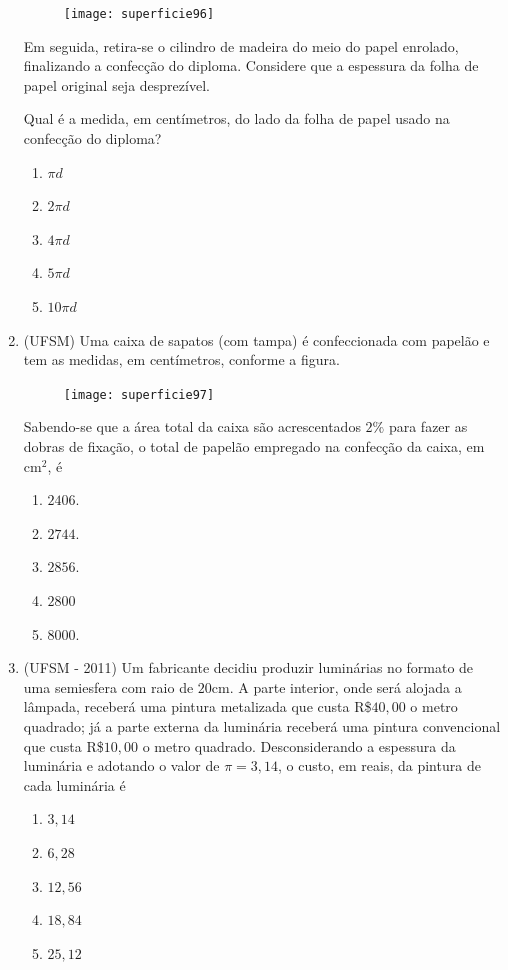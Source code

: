 \begin{enumerate}
\begin{figure}[H]
  \texttt{[image: superficie96]}
  \end{figure}

  Em seguida, retira-se o cilindro de madeira do meio do  papel enrolado, finalizando a confecção do diploma. Considere que a espessura da folha de papel original seja desprezível.
\clearpage

  Qual é a medida, em centímetros, do lado da folha de papel usado na confecção do diploma?

  \begin{enumerate}
    \item $\pi d$ 
    \item $2\pi d$
    \item $4\pi d$
    \item $5\pi d$ 
    \item $10\pi d$
  \end{enumerate}

  \item (UFSM) Uma caixa de sapatos (com tampa) é confeccionada com papelão e tem as medidas, em centímetros, conforme a figura.

  \begin{figure}[H]
  \centering

  \texttt{[image: superficie97]}
  \end{figure}

  Sabendo-se que a área total da caixa são acrescentados $2\%$ para fazer as dobras de fixação, o total de papelão empregado na confecção da caixa, em cm$^2$, é
  \begin{enumerate}
    \item $2406$.
    \item $2744$.
    \item $2856$.
    \item $2800$
    \item $8000$.
  \end{enumerate}

\clearpage
  \item (UFSM - 2011) Um fabricante decidiu produzir luminárias no formato de uma semiesfera com raio de $20$cm. A parte interior, onde será alojada a lâmpada, receberá uma pintura metalizada que custa R\$$40{,}00$ o metro quadrado; já a parte externa da luminária receberá uma pintura convencional que custa R\$$10{,}00$ o metro quadrado. Desconsiderando a espessura da luminária e adotando o valor de $\pi=3{,}14$, o custo, em reais, da pintura de cada luminária é

  \begin{enumerate}
    \item $3{,}14$
    \item $6{,}28$
    \item $12{,}56$
    \item $18{,}84$
    \item $25{,}12$
  \end{enumerate}


\end{enumerate}
